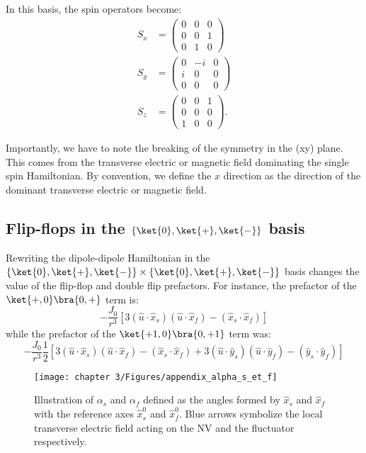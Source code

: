 \documentclass[a4paper, 11pt]{report}
\begin{document}
In this basis, the spin operators become:
\begin{align*}
S_x&=\begin{pmatrix}
0&0&0 \\
0&0&1 \\
0&1&0
\end{pmatrix} \\
S_y&=\begin{pmatrix}
0&-i&0 \\
i&0&0 \\
0&0&0
\end{pmatrix} \\
S_z&=\begin{pmatrix}
0&0&1 \\
0&0&0 \\
1&0&0
\end{pmatrix}.
\end{align*}


Importantly, we have to note the breaking of the symmetry in the (xy) plane. This comes from the transverse electric or magnetic field dominating the single spin Hamiltonian. By convention, we define the $x$ direction as the direction of the dominant transverse electric or magnetic field.

\subsection{Flip-flops in the $\{ \ket{0}, \ket{+}, \ket{-}\}$ basis}
\label{sec flip-flop +/-}
Rewriting the dipole-dipole Hamiltonian in the $\{ \ket{0}, \ket{+}, \ket{-}\} \times \{ \ket{0}, \ket{+}, \ket{-}\}$ basis changes the value of the flip-flop and double flip prefactors. For instance, the prefactor of the $\ket{+,0}\bra{0,+}$ term is: \begin{equation}
-\frac{J_0}{r^3}\left[3(\hat{u}\cdot\hat{x}_s)(\hat{u}\cdot\hat{x}_f) - (\hat{x}_s \cdot \hat{x}_f)\right]
\end{equation}
while the prefactor of the $\ket{+1,0}\bra{0,+1}$ term was: \begin{equation}
-\frac{J_0}{r^3}\frac{1}{2}\left[3(\hat{u}\cdot\hat{x}_s)(\hat{u}\cdot\hat{x}_f) - (\hat{x}_s \cdot \hat{x}_f) + 3(\hat{u}\cdot\hat{y}_s)(\hat{u}\cdot\hat{y}_f) - (\hat{y}_s \cdot \hat{y}_f) \right] 
\end{equation}

\begin{figure}[h]
\centering
\texttt{[image: chapter 3/Figures/appendix\_alpha\_s\_et\_f]}
\caption{Illustration of $\alpha_s$ and $\alpha_f$ defined as the angles formed by $\hat x_s$ and $\hat x_f$ with the reference axes $\hat x_s^0$ and $\hat x_f^0$. Blue arrows symbolize the local transverse electric field acting on the NV and the fluctuator respectively.}
\label{alpha s et f}
\end{figure}
\end{document}
